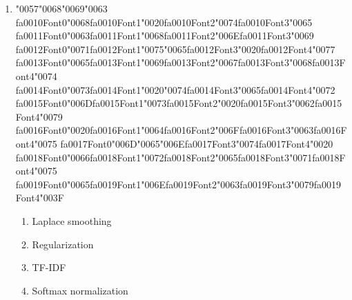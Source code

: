 \documentclass[12pt]{article}
\begin{document}
\begin{enumerate}[label=Q\arabic*.]
\item {\char"0057}{\char"0068}{\char"0069}{\char"0063} {\csname fa0010Font0\endcsname\char"0068}{\csname fa0010Font1\endcsname\char"0020}{\csname fa0010Font2\endcsname\char"0074}{\csname fa0010Font3\endcsname\char"0065} {\csname fa0011Font0\endcsname\char"0063}{\csname fa0011Font1\endcsname\char"0068}{\csname fa0011Font2\endcsname\char"006E}{\csname fa0011Font3\endcsname\char"0069} {\csname fa0012Font0\endcsname\char"0071}{\csname fa0012Font1\endcsname\char"0075}{\char"0065}{\csname fa0012Font3\endcsname\char"0020}{\csname fa0012Font4\endcsname\char"0077} {\csname fa0013Font0\endcsname\char"0065}{\csname fa0013Font1\endcsname\char"0069}{\csname fa0013Font2\endcsname\char"0067}{\csname fa0013Font3\endcsname\char"0068}{\csname fa0013Font4\endcsname\char"0074} {\csname fa0014Font0\endcsname\char"0073}{\csname fa0014Font1\endcsname\char"0020}{\char"0074}{\csname fa0014Font3\endcsname\char"0065}{\csname fa0014Font4\endcsname\char"0072} {\csname fa0015Font0\endcsname\char"006D}{\csname fa0015Font1\endcsname\char"0073}{\csname fa0015Font2\endcsname\char"0020}{\csname fa0015Font3\endcsname\char"0062}{\csname fa0015Font4\endcsname\char"0079} {\csname fa0016Font0\endcsname\char"0020}{\csname fa0016Font1\endcsname\char"0064}{\csname fa0016Font2\endcsname\char"006F}{\csname fa0016Font3\endcsname\char"0063}{\csname fa0016Font4\endcsname\char"0075} {\csname fa0017Font0\endcsname\char"006D}{\char"0065}{\char"006E}{\csname fa0017Font3\endcsname\char"0074}{\csname fa0017Font4\endcsname\char"0020} {\csname fa0018Font0\endcsname\char"0066}{\csname fa0018Font1\endcsname\char"0072}{\csname fa0018Font2\endcsname\char"0065}{\csname fa0018Font3\endcsname\char"0071}{\csname fa0018Font4\endcsname\char"0075} {\csname fa0019Font0\endcsname\char"0065}{\csname fa0019Font1\endcsname\char"006E}{\csname fa0019Font2\endcsname\char"0063}{\csname fa0019Font3\endcsname\char"0079}{\csname fa0019Font4\endcsname\char"003F}
\begin{enumerate}[label=(\Alph*)]
    \item Laplace smoothing
    \item Regularization
    \item TF-IDF
    \item Softmax normalization
\end{enumerate}

\end{enumerate}
\end{document}
